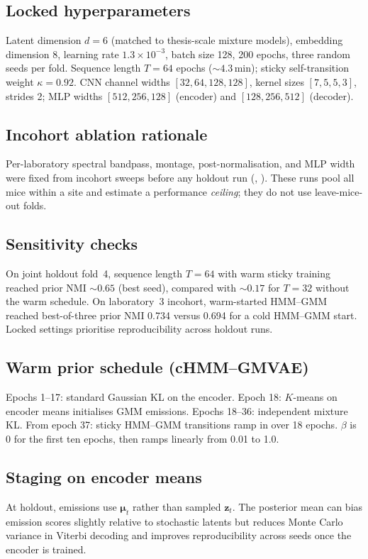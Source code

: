 
\subsection{Locked hyperparameters}
\label{app:methods:hyper}
Latent dimension $d{=}6$ (matched to thesis-scale mixture models), embedding dimension 8, learning rate $1.3 \times 10^{-3}$, batch size 128, 200 epochs, three random seeds per fold.
Sequence length $T{=}64$ epochs (${\sim}4.3$\,min); sticky self-transition weight $\kappa{=}0.92$.
CNN channel widths $[32,64,128,128]$, kernel sizes $[7,5,5,3]$, strides 2; MLP widths $[512,256,128]$ (encoder) and $[128,256,512]$ (decoder).

\subsection{Incohort ablation rationale}
Per-laboratory spectral bandpass, montage, post-normalisation, and MLP width were fixed from incohort sweeps before any holdout run (, ).
These runs pool all mice within a site and estimate a performance \emph{ceiling}; they do not use leave-mice-out folds.

\subsection{Sensitivity checks}
On joint holdout fold~4, sequence length $T{=}64$ with warm sticky training reached prior NMI ${\sim}0.65$ (best seed), compared with ${\sim}0.17$ for $T{=}32$ without the warm schedule.
On laboratory~3 incohort, warm-started HMM--GMM reached best-of-three prior NMI 0.734 versus 0.694 for a cold HMM--GMM start.
Locked settings prioritise reproducibility across holdout runs.

\subsection{Warm prior schedule (cHMM--GMVAE)}
\label{app:methods:warmstart}
Epochs 1--17: standard Gaussian KL on the encoder.
Epoch 18: $K$-means on encoder means initialises GMM emissions.
Epochs 18--36: independent mixture KL.
From epoch 37: sticky HMM--GMM transitions ramp in over 18 epochs.
$\beta$ is 0 for the first ten epochs, then ramps linearly from 0.01 to 1.0.

\subsection{Staging on encoder means}
At holdout, emissions use $\boldsymbol{\mu}_t$ rather than sampled $\mathbf{z}_t$.
The posterior mean can bias emission scores slightly relative to stochastic latents but reduces Monte Carlo variance in Viterbi decoding and improves reproducibility across seeds once the encoder is trained.

